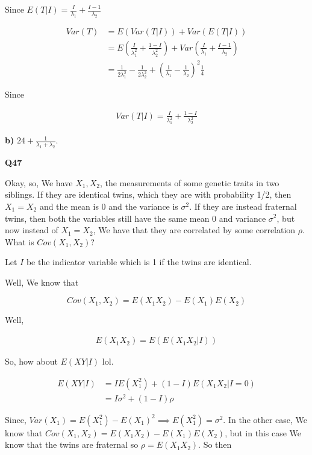 \documentclass{article}
\begin{document}
			Since $E(T|I) = \frac{I}{\lambda_1} + \frac{I-1}{\lambda_2}$
			
			\begin{align*}
			Var(T) &= E(Var(T|I)) + Var(E(T|I))\\
			&= E\left(\frac{I}{\lambda_1^2} + \frac{1-I}{\lambda_2^2} \right) + Var\left(\frac{I}{\lambda_1} + \frac{I-1}{\lambda_2} \right)\\
			&= \frac{1}{2\lambda_1^2} - \frac{1}{2\lambda_2^2} + \left(\frac{1}{\lambda_1} - \frac{1}{\lambda_2} \right)^2\frac{1}{4}
			\end{align*}
			
			Since
			
			\begin{align*}
			Var(T|I) = \frac{I}{\lambda_1^2} + \frac{1-I}{\lambda_2^2}
			\end{align*}
			
			\textbf{b)} $24+\frac{1}{\lambda_1 + \lambda_2}$.
			
			\hfill
			
		\textbf{Q47}
		
			Okay, so, We have $X_1, X_2$, the measurements of some genetic traits in two siblings. If they are identical twins, which they are with probability 1/2, then $X_1=X_2$ and the mean is 0 and the variance is $\sigma^2$. If they are instead fraternal twins, then both the variables still have the same mean 0 and variance $\sigma^2$, but now instead of $X_1=X_2$, We have that they are correlated by some correlation $\rho$. What is $Cov(X_1, X_2)$?
			
			Let $I$ be the indicator variable which is 1 if the twins are identical.
			
			Well, We know that
			
			\[Cov(X_1, X_2) = E(X_1X_2) -E(X_1)E(X_2) \]
			
			Well, 
			
			\begin{align*}
			E(X_1X_2) = E(E(X_1X_2|I))
			\end{align*}
			
			So, how about $E(XY|I)$ lol. 
			
			\begin{align*}
			E(XY|I) &= IE(X_1^2) + (1-I)E(X_1X_2|I=0)\\
			&= I\sigma^2 + (1-I)\rho
			\end{align*}
			
			Since, $Var(X_1) = E(X_1^2) - E(X_1)^2 \implies E(X_1^2) = \sigma^2$. In the other case, We know that $Cov(X_1, X_2) = E(X_1X_2) - E(X_1)E(X_2)$, but in this case We know that the twins are fraternal so $\rho = E(X_1X_2)$. So then
			
\end{document}
